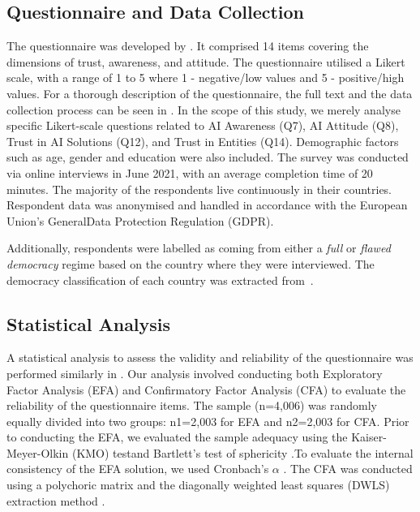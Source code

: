 \documentclass[
]{ceurart}
\begin{document}
\subsection{Questionnaire and Data Collection}
The questionnaire was developed by \cite{scantamburlo2023artificial}. It comprised 14 items covering the dimensions of trust, awareness, and attitude. The questionnaire utilised a Likert scale, with a range of 1 to 5 where 1 - negative/low values and 5 - positive/high values. For a thorough description of the questionnaire, the full text and the data collection process can be seen in \cite{scantamburlo2023artificial}.
In the scope of this study, we merely analyse specific Likert-scale questions related to AI Awareness (Q7), AI Attitude (Q8), Trust in AI Solutions (Q12), and Trust in Entities (Q14). Demographic factors such as age, gender and education were also included. The survey was conducted via online interviews in June 2021, with an average completion time of 20 minutes. The majority of the respondents live continuously in their countries. Respondent data was anonymised and handled in accordance with the European Union's GeneralData Protection Regulation (GDPR). 

Additionally, respondents were labelled as coming from either a \textit{full} or \textit{flawed democracy} regime based on the country where they were interviewed. The democracy classification of each country was extracted from~\cite{unit2022democracy}. 

\subsection{Statistical Analysis}

A statistical analysis to assess the validity and reliability of the questionnaire was performed similarly in \cite{scantamburlo2023artificial}. Our analysis involved conducting both Exploratory Factor Analysis (EFA) and Confirmatory Factor Analysis (CFA) to evaluate the reliability of the questionnaire items. The sample (n=4,006) was randomly equally divided into two groups: n1=2,003 for EFA and n2=2,003 for CFA. Prior to conducting the EFA, we evaluated the sample adequacy using the Kaiser-Meyer-Olkin (KMO) testand Bartlett's test of sphericity \cite{kaiser1974index}.To evaluate the internal consistency of the EFA solution, we used Cronbach's $\alpha$ \cite{gadermann2019estimating}. The CFA was conducted using a polychoric matrix and the diagonally weighted least squares (DWLS) extraction method \cite{li2016confirmatory}. 
\end{document}
